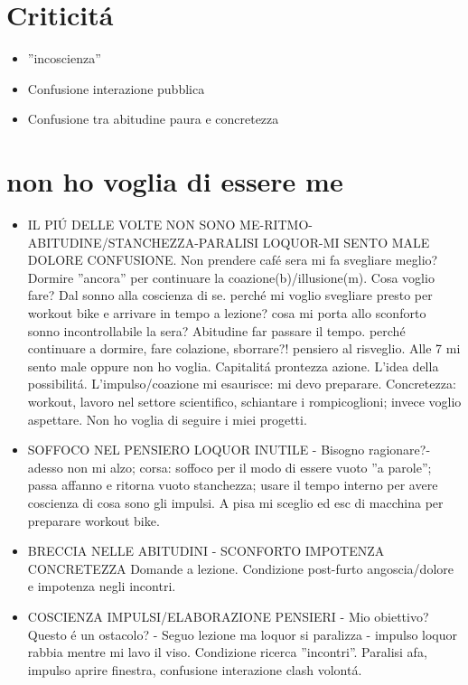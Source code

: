 \section{Criticit\'a}
\begin{itemize}
\item ''incoscienza''
    \item Confusione interazione pubblica
    \item Confusione tra abitudine paura e concretezza
\end{itemize}

\section{non ho voglia di essere me}

\begin{itemize}
\item IL PI\'U DELLE VOLTE NON SONO ME-RITMO-ABITUDINE/STANCHEZZA-PARALISI LOQUOR-MI SENTO MALE DOLORE CONFUSIONE. Non prendere caf\'e sera mi fa svegliare meglio? Dormire ''ancora'' per continuare la coazione(b)/illusione(m). Cosa voglio fare? Dal sonno alla coscienza di se. perch\'e mi voglio svegliare presto per workout bike e arrivare in tempo a lezione? cosa mi porta allo sconforto sonno incontrollabile la sera? Abitudine far passare il tempo. perch\'e continuare a dormire, fare colazione, sborrare?! pensiero al risveglio. Alle 7 mi sento male  oppure non ho voglia. Capitalit\'a prontezza azione. L'idea della possibilit\'a. L'impulso/coazione mi esaurisce: mi devo preparare. Concretezza: workout, lavoro nel settore scientifico, schiantare i rompicoglioni; invece voglio aspettare. Non ho voglia di seguire i miei progetti.
\item SOFFOCO NEL PENSIERO LOQUOR INUTILE - Bisogno ragionare?- adesso non mi alzo; corsa: soffoco per il modo di essere vuoto ''a parole''; passa affanno e ritorna vuoto stanchezza; usare il tempo interno per avere coscienza di cosa sono gli impulsi. A pisa mi sceglio ed esc di macchina per preparare workout bike.
\item BRECCIA NELLE ABITUDINI - SCONFORTO IMPOTENZA CONCRETEZZA Domande a lezione. Condizione post-furto angoscia/dolore e impotenza negli incontri.
\item COSCIENZA IMPULSI/ELABORAZIONE PENSIERI - Mio obiettivo? Questo \'e un ostacolo? - Seguo lezione ma loquor si paralizza - impulso loquor rabbia mentre mi lavo il viso. Condizione ricerca ''incontri''. Paralisi afa, impulso aprire finestra, confusione interazione clash volont\'a.

\end{itemize}
